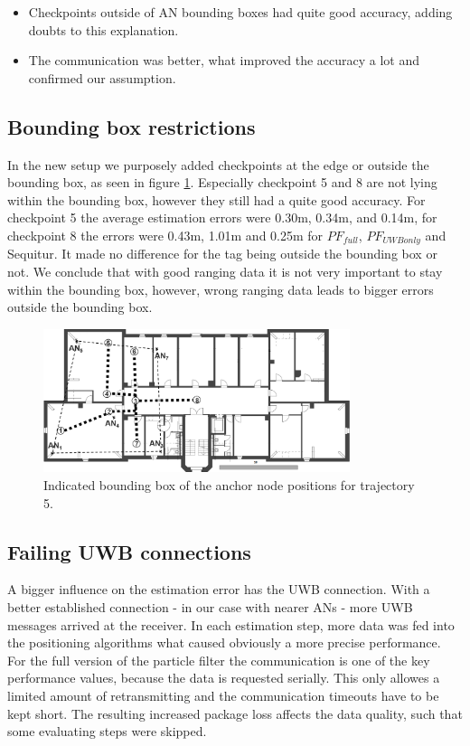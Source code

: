 \begin{itemize}
\item Checkpoints outside of AN bounding boxes had quite good accuracy, adding doubts to this explanation.
\item The communication was better, what improved the accuracy a lot and confirmed our assumption.
\end{itemize}

\subsection{Bounding box restrictions}
In the new setup we purposely added checkpoints at the edge or outside the bounding box, as seen in figure \ref{fig:trajectory5_boundingBox}. Especially checkpoint 5 and 8 are not lying within the bounding box, however they still had a quite good accuracy. For checkpoint 5 the average estimation errors were 0.30m, 	0.34m, and 0.14m, for checkpoint 8 the errors were 0.43m,	1.01m and 0.25m for $PF_{full}$, $PF_{UWBonly}$ and Sequitur. It made no difference for the tag being outside the bounding box or not. We conclude that with good ranging data it is not very important to stay within the bounding box, however, wrong ranging data leads to bigger errors outside the bounding box.

\begin{figure}[th]
\centering
\includegraphics[width=0.8\textwidth]{Figures/trajectory5_boundingBox}
\decoRule
\caption[Trajectory 5 with bounding box]{Indicated bounding box of the anchor node positions for trajectory 5.}
\label{fig:trajectory5_boundingBox}
\end{figure}

\subsection{Failing UWB connections}
A bigger influence on the estimation error has the UWB connection. With a better established connection - in our case with nearer ANs - more UWB messages arrived at the receiver. In each estimation step, more data was fed into the positioning algorithms what caused obviously a more precise performance. For the full version of the particle filter the communication is one of the key performance values, because the data is requested serially. This only allowes a limited amount of retransmitting and the communication timeouts have to be kept short. The resulting increased package loss affects the data quality,  such that some evaluating steps were skipped. 
